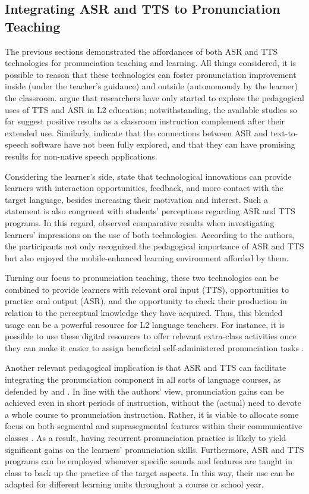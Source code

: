 \documentclass[english]{textolivre}
\begin{document}
\subsection{Integrating ASR and TTS to Pronunciation Teaching}\label{sec-3.3}
The previous sections demonstrated the affordances of both ASR and TTS technologies for pronunciation teaching and learning. All things considered, it is possible to reason that these technologies can foster pronunciation improvement inside (under the teacher's guidance) and outside (autonomously by the learner) the classroom. \textcite{liakin2017} argue that researchers have only started to explore the pedagogical uses of TTS and ASR in L2 education; notwithstanding, the available studies so far suggest positive results as a classroom instruction complement after their extended use. Similarly, \textcite{levis2013} indicate that the connections between ASR and text-to-speech software have not been fully explored, and that they can have promising results for non-native speech applications.

Considering the learner’s side, \textcite{golonka2014} state that technological innovations can provide learners with interaction opportunities, feedback, and more contact with the target language, besides increasing their motivation and interest. Such a statement is also congruent with students’ perceptions regarding ASR and TTS programs. In this regard, \textcite{liakin2017} observed comparative results when investigating learners' impressions on the use of both technologies. According to the authors, the participants not only recognized the pedagogical importance of ASR and TTS but also enjoyed the mobile-enhanced learning environment afforded by them.

Turning our focus to pronunciation teaching, these two technologies can be combined to provide learners with relevant oral input (TTS), opportunities to practice oral output (ASR), and the opportunity to check their production in relation to the perceptual knowledge they have acquired. Thus, this blended usage can be a powerful resource for L2 language teachers. For instance, it is possible to use these digital resources to offer relevant extra-class activities once they can make it easier to assign beneficial self-administered pronunciation tasks \cite{munro2015}.

Another relevant pedagogical implication is that ASR and TTS can facilitate integrating the pronunciation component in all sorts of language courses, as defended by \textcite{darcy2021} and \textcite{gordon2016}. In line with the authors’ view, pronunciation gains can be achieved even in short periods of instruction, without the (actual) need to devote a whole course to pronunciation instruction. Rather, it is viable to allocate some focus on both segmental and suprasegmental features within their communicative classes \cite{darcy2021}. As a result, having recurrent pronunciation practice is likely to yield significant gains on the learners’ pronunciation skills. Furthermore, ASR and TTS programs can be employed whenever specific sounds and features are taught in class to back up the practice of the target aspects. In this way, their use can be adapted for different learning units throughout a course or school year.
\end{document}
